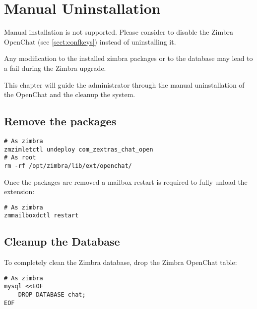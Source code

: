 \section{Manual Uninstallation}

\begin{warning}
    Manual installation is not supported.
    Please consider to disable the Zimbra OpenChat (see \autoref{sect:confkeys}) instead of uninstalling it.

    Any modification to the installed zimbra packages or to the database may lead to a fail during the Zimbra upgrade.
\end{warning}

This chapter will guide the administrator through the manual uninstallation of the OpenChat and
the cleanup the system.

\subsection{Remove the packages}
    \begin{verbatim}
# As zimbra
zmzimletctl undeploy com_zextras_chat_open
# As root
rm -rf /opt/zimbra/lib/ext/openchat/
    \end{verbatim}

    Once the packages are removed a mailbox restart is required to fully unload the extension:
    \begin{verbatim}
# As zimbra
zmmailboxdctl restart
    \end{verbatim}

\subsection{Cleanup the Database}
    To completely clean the Zimbra database, drop the Zimbra OpenChat table:
    \begin{verbatim}
# As zimbra
mysql <<EOF
    DROP DATABASE chat;
EOF
    \end{verbatim}
